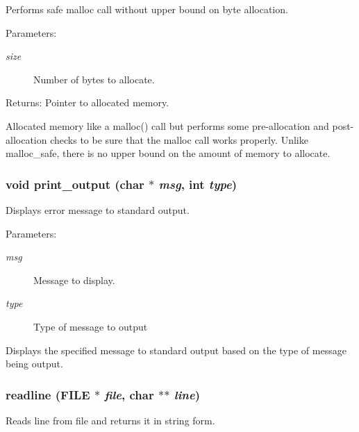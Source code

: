 Performs safe malloc call without upper bound on byte allocation. 

\begin{Desc}
\item[Parameters:]
\begin{description}
\item[{\em size}]Number of bytes to allocate.\end{description}
\end{Desc}
\begin{Desc}
\item[Returns:]Pointer to allocated memory.\end{Desc}
Allocated memory like a malloc() call but performs some pre-allocation and post-allocation checks to be sure that the malloc call works properly. Unlike malloc\_\-safe, there is no upper bound on the amount of memory to allocate. 
\subsubsection{\setlength{\rightskip}{0pt plus 5cm}void print\_\-output (char $\ast$ {\em msg}, int {\em type})}\label{util_8h_a2}


Displays error message to standard output. 

\begin{Desc}
\item[Parameters:]
\begin{description}
\item[{\em msg}]Message to display. \item[{\em type}]Type of message to output\end{description}
\end{Desc}
Displays the specified message to standard output based on the type of message being output. 
\subsubsection{ readline (FILE $\ast$ {\em file}, char $\ast$$\ast$ {\em line})}\label{util_8h_a8}


Reads line from file and returns it in string form. 

